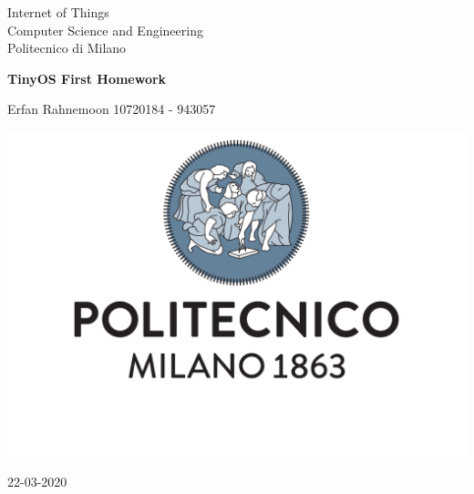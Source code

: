 \documentclass[10pt,english, openany]{book}
\begin{document}

\begin{titlepage}
	\clearpage\thispagestyle{empty}
	\centering
	\vspace{1cm}

	{\normalsize Internet of Things \\ 
		Computer Science and Engineering \\
		Politecnico di Milano \par}
		\vspace{3cm}
	{\Huge \textbf{TinyOS First Homework}} \\
	\vspace{4cm}
	{\normalsize Erfan Rahnemoon 10720184 - 943057 \par}
	\vspace{5cm}
    
    \centering \includegraphics[scale=0.4]{logo1.pdf}
    
    \vspace{0.5cm}
		
	{\normalsize 22-03-2020 \par}
	

\end{titlepage}

\end{document}
